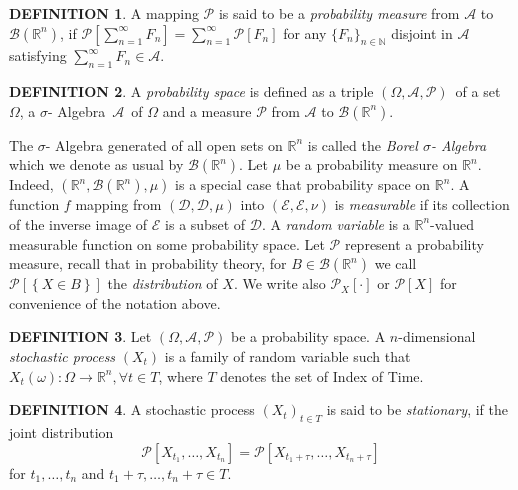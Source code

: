 \documentclass[a4paper, twoside, 11pt]{article}
\theoremstyle{definition}
\newtheorem{definition}{DEFINITION}[section]
\def\AA{$\mathscr{A}$\ }
\def\sa{$\sigma$- Algebra\ }
\def\bs{$(\Omega, \mathscr{A}, \mathcal{P})$\ }
\def\bsigma{\mathscr{B}\brkt{\mathbb{R}^{n}}}
\newcommand{\sqbr}[1]{\left[ {#1} \right]}
\newcommand{\brkt}[1]{\left({#1} \right)}
\begin{document}
\begin{definition}
  A mapping $\mathcal{P}$ is said to be a \emph{probability measure} from $\mathscr{A}$ to $\bsigma$, if $\mathcal{P}\sqbr{\sum_{n=1}^{\infty} F_n} = \sum_{n=1}^{\infty} \mathcal{P}\sqbr{F_n}$ for any $\{F_n\}_{n \in \mathbb{N}}$ disjoint in $\mathscr{A}$ satisfying $\sum_{n=1}^{\infty}F_n \in \mathscr{A}$. 
\end{definition}

\begin{definition}
  A \emph{probability space} is defined as a triple \bs of a set $\Omega$, a \sa \AA  of $\Omega$ and a measure $\mathcal{P}$ from $\mathscr{A}$ to $\bsigma$.
\end{definition}

The $\sigma$- Algebra generated of all open sets on $\mathbb{R}^{n}$ is called the \emph{Borel $\sigma$- Algebra} which we denote as usual by $\mathscr{B}\left(\mathbb{R}^{n}\right)$. Let $\mu$ be a probability measure on $\mathbb{R}^{n}$. Indeed, $\brkt{\mathbb{R}^{n}, \mathscr{B}\brkt{\mathbb{R}^{n}}, \mu}$ is a special case that probability space on $\mathbb{R}^{n}$. A function $f$ mapping from $\brkt{\mathcal{D}, \mathscr{D}, \mu}$ into $\brkt{\mathcal{E}, \mathscr{E}, \nu}$ is \emph{measurable} if its collection of the inverse image of $\mathscr{E}$ is a subset of $\mathscr{D}$. A \emph{random variable} is a $\mathbb{R}^{n}$-valued measurable function on some probability space. Let $\mathcal{P}$ represent a probability measure, recall that in probability theory, for $B \in \bsigma$ we call $\mathcal{P}\sqbr{\left\{X \in B\right\}}$ the \emph{distribution} of $X$. We write also $\mathcal{P}_X \sqbr{\cdot}$ or $\mathcal{P}\sqbr{X}$ for convenience of the notation above.

\begin{definition}
  Let $\brkt{\Omega, \mathscr{A}, \mathcal{P}}$ be a probability space. A $n$-dimensional \emph{stochastic process} $\brkt{X_t}$ is a family of random variable such that $X_t\brkt{\omega} : \Omega \longrightarrow  \mathbb{R}^{n},  \forall t \in T$, where $T$ denotes the set of Index of Time.    
\end{definition}

\begin{definition}
  A stochastic process $\brkt{X_t}_{t \in T}$ is said to be \emph{stationary}, if the joint distribution 
\[
  \mathcal{P}\sqbr{X_{t_1},\dots,X_{t_n}} = \mathcal{P}\sqbr{X_{t_1+\tau},\dots,X_{t_n+\tau}} 
\]
for $t_1, \dots, t_n$ and $t_1+\tau,\dots,t_n+\tau \in T$. 
\label{sec:stn}
\end{definition}
\end{document}

